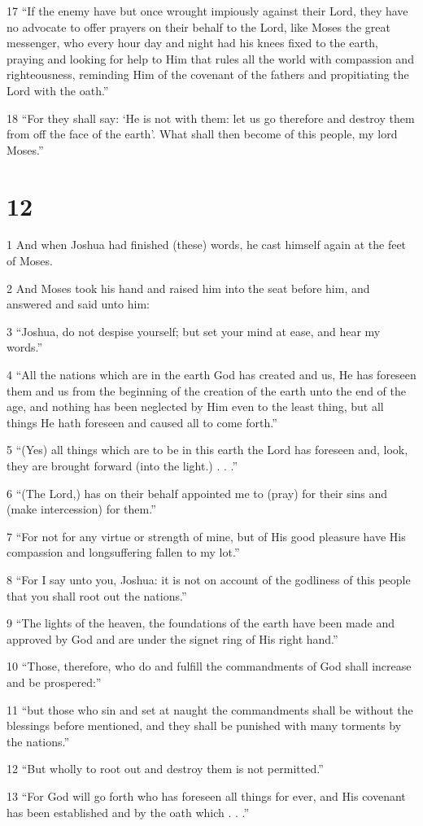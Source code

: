 \par 17 “If the enemy have but once wrought impiously against their Lord, they have no advocate to offer prayers on their behalf to the Lord, like Moses the great messenger, who every hour day and night had his knees fixed to the earth, praying and looking for help to Him that rules all the world with compassion and righteousness, reminding Him of the covenant of the fathers and propitiating the Lord with the oath.”
\par 18 “For they shall say: ‘He is not with them: let us go therefore and destroy them from off the face of the earth’. What shall then become of this people, my lord Moses.”

\chapter{12}

\par 1 And when Joshua had finished (these) words, he cast himself again at the feet of Moses.
\par 2 And Moses took his hand and raised him into the seat before him, and answered and said unto him:
\par 3 “Joshua, do not despise yourself; but set your mind at ease, and hear my words.”
\par 4 “All the nations which are in the earth God has created and us, He has foreseen them and us from the beginning of the creation of the earth unto the end of the age, and nothing has been neglected by Him even to the least thing, but all things He hath foreseen and caused all to come forth.”
\par 5 “(Yes) all things which are to be in this earth the Lord has foreseen and, look, they are brought forward (into the light.) . . .”
\par 6 “(The Lord,) has on their behalf appointed me to (pray) for their sins and (make intercession) for them.”
\par 7 “For not for any virtue or strength of mine, but of His good pleasure have His compassion and longsuffering fallen to my lot.”
\par 8 “For I say unto you, Joshua: it is not on account of the godliness of this people that you shall root out the nations.”
\par 9 “The lights of the heaven, the foundations of the earth have been made and approved by God and are under the signet ring of His right hand.”
\par 10 “Those, therefore, who do and fulfill the commandments of God shall increase and be prospered:”
\par 11 “but those who sin and set at naught the commandments shall be without the blessings before mentioned, and they shall be punished with many torments by the nations.”
\par 12 “But wholly to root out and destroy them is not permitted.”
\par 13 “For God will go forth who has foreseen all things for ever, and His covenant has been established and by the oath which . . .”

